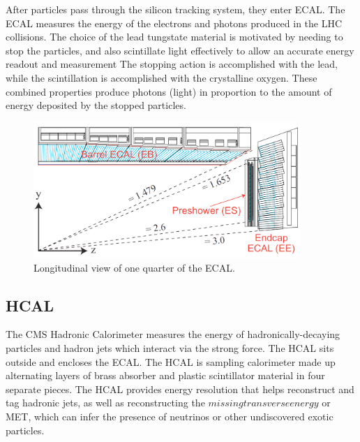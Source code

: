 After particles pass through the silicon tracking system, they enter ECAL. The ECAL measures the energy of the electrons and photons produced in the LHC collisions.
The choice of the lead tungstate material is motivated by needing to stop the particles, and also scintillate light effectively to allow an accurate energy readout and measurement
The stopping action is accomplished with the lead, while the scintillation is accomplished with
the crystalline oxygen. These combined properties produce photons (light) in proportion to the amount of energy deposited by the stopped particles.

\begin{figure}[hbtp]
 \begin{center}
   \includegraphics[width=0.9\textwidth]{ecal_rapidity.pdf}
   \caption[text in square brackets]{Longitudinal view of one quarter of the ECAL.}
   \label{fig:cms_ecal}
 \end{center}
\end{figure}

\subsection{HCAL}
The CMS Hadronic Calorimeter measures the energy of hadronically-decaying particles and hadron jets which interact via the strong force. The HCAL sits outside and encloses the ECAL.
The HCAL is sampling calorimeter made up alternating layers of brass absorber and plastic scintillator material in four separate pieces. The HCAL provides energy resolution that helps reconstruct and tag hadronic
jets, as well as reconstructing the $missing transverse energy$ or MET, which can infer the presence of neutrinos or other undiscovered exotic particles. 

